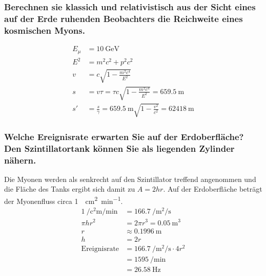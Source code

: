 \subsubsection{Berechnen sie klassich und relativistisch aus der Sicht eines auf der Erde ruhenden Beobachters die Reichweite eines kosmischen Myons.}
\begin{align*}
    E_{\mu} &= \SI{10}{\giga \electronvolt}\\
    E^2 &= m^2c^2 + p^2c^2 \\
    v &= c\sqrt{1-\frac{m^2 c^4}{E^2}}\\
    s &= v\tau = \tau c \sqrt{1-\frac{m^2 c^4}{E^2}} = \SI{659.5}{\metre}\\
    s\prime &= \frac{s}{\gamma} = \SI{659.5}{\metre} \sqrt{1-\frac{v^2}{c^2}} = \SI{62418}{\metre}
\end{align*}
\subsubsection{Welche Ereignisrate erwarten Sie auf der Erdoberfläche? Den Szintillatortank können Sie als liegenden Zylinder nähern.}
Die Myonen werden als senkrecht auf den Szintillator treffend angenommen und die Fläche des Tanks ergibt sich damit zu $A = 2hr$.
Auf der Erdoberfläche beträgt der Myonenfluss circa \SI{1}{\per \square \centi \metre \per \minute}.
\begin{align*}
    \SI{1}{\per \square \centi \metre \per \minute} &= \SI{166.7}{\per \square \metre \per \second} \\
    \pi h r^2 &= 2\pi r^3 = \SI{0.05}{\cubic \metre} \\
    r &≈ \SI{0.1996}{\meter} \\
    h &= 2r \\
    \text{Ereignisrate} &= \SI{166.7}{\per \square \metre \per \second} \cdot 4r^2 \\
    &= \SI{1595}{\per \minute} \\
    &= \SI{26.58}{\hertz}
\end{align*}